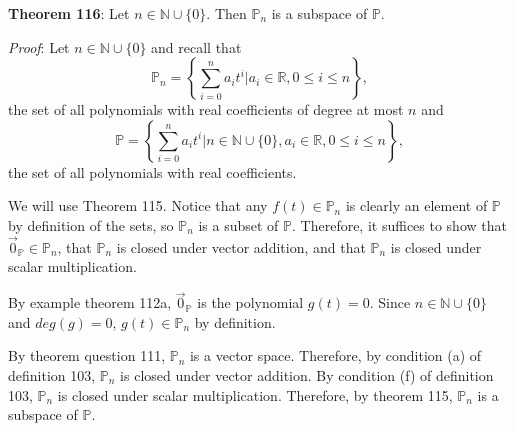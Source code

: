 \documentclass{exam}
\begin{document}

\textbf{Theorem 116}: Let $n\in\mathbb{N}\cup\{0\}$. Then $\mathbb{P}_n$ is a subspace of $\mathbb{P}$.\newline
\vspace{0.2in}
\newline

\textit{Proof}: Let $n\in\mathbb{N}\cup\{0\}$ and recall that $$\mathbb{P}_n=\left\{\sum_{i=0}^n a_it^i|a_i\in\mathbb{R},0\leq i\leq n\right\},$$ the set of all polynomials with real coefficients of degree at most $n$ and $$\mathbb{P}=\left\{\sum_{i=0}^n a_it^i|n\in\mathbb{N}\cup\{0\},a_i\in\mathbb{R},0\leq i\leq n\right\},$$ the set of all polynomials with real coefficients.

We will use Theorem 115. Notice that any $f(t)\in\mathbb{P}_n$ is clearly an element of $\mathbb{P}$ by definition of the sets, so $\mathbb{P}_n$ is  a subset of $\mathbb{P}$. Therefore, it suffices to show that $\Vec{0}_{\mathbb{P}}\in\mathbb{P}_n$, that $\mathbb{P}_n$ is closed under vector addition, and that $\mathbb{P}_n$ is closed under scalar multiplication. 

By example theorem 112a, $\Vec{0}_{\mathbb{P}}$ is the polynomial $g(t)=0$. Since $n\in\mathbb{N}\cup\{0\}$ and $deg(g)=0$, $g(t)\in\mathbb{P}_n$ by definition.

By theorem question 111, $\mathbb{P}_n$ is a vector space. Therefore, by condition (a) of definition 103, $\mathbb{P}_n$ is closed under vector addition. By condition (f) of definition 103, $\mathbb{P}_n$ is closed under scalar multiplication. Therefore, by theorem 115, $\mathbb{P}_n$ is a subspace of $\mathbb{P}$.
\end{document}
